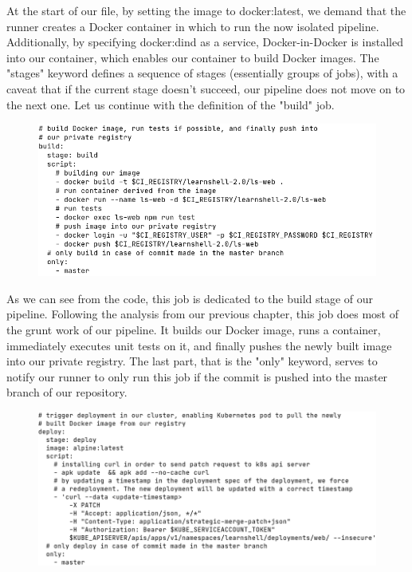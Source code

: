 \documentclass[thesis=B,english]{FITthesis}[2019/12/23]
\begin{document}
At the start of our file, by setting the image to docker:latest, we demand that the runner creates a Docker container in which to run the now isolated pipeline. Additionally, by specifying docker:dind as a service, Docker-in-Docker is installed into our container, which enables our container to build Docker images. The "stages" keyword defines a sequence of stages (essentially groups of jobs), with a caveat that if the current stage doesn't succeed, our pipeline does not move on to the next one. Let us continue with the definition of the "build" job.

\begin{figure}[H]
\centering
\hspace*{-0.3cm}
\includegraphics[scale=0.5]{gitlab-ci-build}
\end{figure}

As we can see from the code, this job is dedicated to the build stage of our pipeline. Following the analysis from our previous chapter, this job does most of the grunt work of our pipeline. It builds our Docker image, runs a container, immediately executes unit tests on it, and finally pushes the newly built image into our private registry. The last part, that is the "only" keyword, serves to notify our runner to only run this job if the commit is pushed into the master branch of our repository.

\begin{figure}[H]
\centering
\hspace*{-0.5cm}
\includegraphics[scale=0.5]{gitlab-ci-deploy}
\end{figure}
\end{document}
